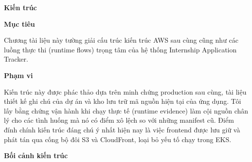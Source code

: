 \vspace{0.5em}\noindent\textbf{Kiến trúc}\par

\vspace{0.5em}\noindent\textbf{Mục tiêu}\par

Chương tài liệu này tường giải cấu trúc kiến trúc AWS sau cùng cũng như
các luồng thực thi (runtime flows) trọng tâm của hệ thống Internship
Application Tracker.

\vspace{0.5em}\noindent\textbf{Phạm vi}\par

Kiến trúc này được phác thảo dựa trên minh chứng production sau cùng,
tài liệu thiết kế ghi chú của dự án và kho lưu trữ mã nguồn hiện tại của
ứng dụng. Tôi lấy bằng chứng vận hành khi chạy thực tế (runtime
evidence) làm cội nguồn chân lý cho các tình huống mà nó có điểm xô lệch
so với những manifest cũ. Điểm đính chính kiến trúc đáng chú ý nhất hiện
nay là việc frontend được lưu giữ và phát tán qua cống bộ đôi S3 và
CloudFront, loại bỏ yếu tố chạy trong EKS.

\vspace{0.5em}\noindent\textbf{Bối cảnh kiến
trúc}\par

